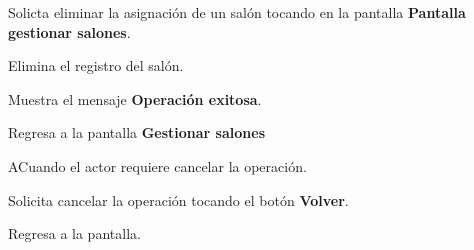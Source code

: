  \begin{UCtrayectoria}
    
    \UCpaso [\UCactor] Solicta eliminar la asignación de un salón tocando  en la pantalla \textbf{Pantalla gestionar salones}. 
    
    \UCpaso Elimina el registro del salón.
    
    \UCpaso Muestra el mensaje \textbf{Operación exitosa}.
    
    \UCpaso Regresa a la pantalla \textbf{Gestionar salones}
    
\end{UCtrayectoria}

\begin{UCtrayectoriaA}{A}{Cuando el actor requiere cancelar la operación.}
	
	\UCpaso [\UCactor] Solicita cancelar la operación tocando el botón \textbf{Volver}.
	
	\UCpaso Regresa a la pantalla.
	
\end{UCtrayectoriaA}


